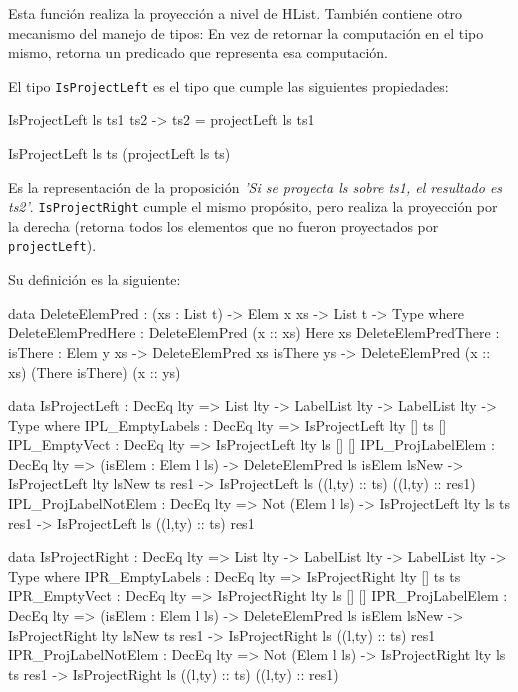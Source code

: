 Esta función realiza la proyección a nivel de HList. También contiene otro mecanismo del manejo de tipos: En vez de retornar la computación en el tipo mismo, retorna un predicado que representa esa computación.

El tipo \texttt{IsProjectLeft} es el tipo que cumple las siguientes propiedades:

\begin{code}
IsProjectLeft ls ts1 ts2 -> ts2 = projectLeft ls ts1

IsProjectLeft ls ts (projectLeft ls ts) 
\end{code}

Es la representación de la proposición \textit{'Si se proyecta ls sobre ts1, el resultado es ts2'}. \texttt{IsProjectRight} cumple el mismo propósito, pero realiza la proyección por la derecha (retorna todos los elementos que no fueron proyectados por \texttt{projectLeft}).

Su definición es la siguiente:

\begin{code}
data DeleteElemPred : (xs : List t) -> Elem x xs -> 
  List t -> Type where
  DeleteElemPredHere : DeleteElemPred (x :: xs) Here xs
  DeleteElemPredThere : {isThere : Elem y xs} -> 
    DeleteElemPred xs isThere ys -> 
    DeleteElemPred (x :: xs) (There isThere) (x :: ys)

data IsProjectLeft : DecEq lty => List lty -> LabelList lty -> 
  LabelList lty -> Type where
  IPL_EmptyLabels : DecEq lty => IsProjectLeft {lty} [] ts []
  IPL_EmptyVect : DecEq lty => IsProjectLeft {lty} ls [] []
  IPL_ProjLabelElem : DecEq lty => (isElem : Elem l ls) -> 
    DeleteElemPred ls isElem lsNew ->
    IsProjectLeft {lty} lsNew ts res1 -> 
    IsProjectLeft ls ((l,ty) :: ts) ((l,ty) :: res1)      
  IPL_ProjLabelNotElem : DecEq lty => Not (Elem l ls) -> 
    IsProjectLeft {lty} ls ts res1 -> 
    IsProjectLeft ls ((l,ty) :: ts) res1

data IsProjectRight : DecEq lty => List lty -> LabelList lty -> 
  LabelList lty -> Type where
  IPR_EmptyLabels : DecEq lty => IsProjectRight {lty} [] ts ts
  IPR_EmptyVect : DecEq lty => IsProjectRight {lty} ls [] []
  IPR_ProjLabelElem : DecEq lty => (isElem : Elem l ls) -> 
    DeleteElemPred ls isElem lsNew ->
    IsProjectRight {lty} lsNew ts res1 -> 
    IsProjectRight ls ((l,ty) :: ts) res1      
  IPR_ProjLabelNotElem : DecEq lty => Not (Elem l ls) -> 
    IsProjectRight {lty} ls ts res1 -> 
    IsProjectRight ls ((l,ty) :: ts) ((l,ty) :: res1)
\end{code}

